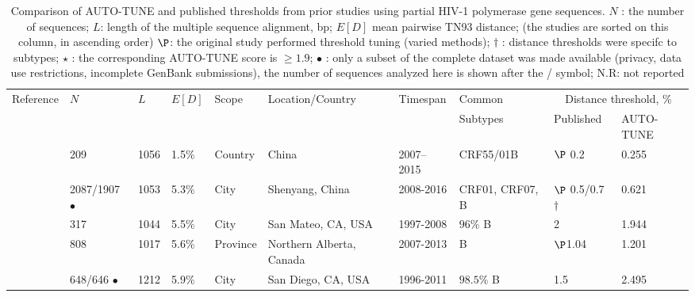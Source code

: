 \documentclass[utf8]{FrontiersinHarvard} %
\begin{document}
\begin{table}[h]
	\caption{Comparison of AUTO-TUNE and published thresholds from prior studies using partial HIV-1 polymerase gene sequences. $N$ : the number of sequences; $L$: length of the multiple sequence alignment, bp; $E[D]$ mean pairwise TN93 distance; (the studies are sorted on this column, in ascending order) $\P$: the original study performed threshold tuning (varied methods); $\dagger$ : distance thresholds were specifc to subtypes; $\star$ : the corresponding AUTO-TUNE score is $\geq 1.9$; $\bullet$ : only a subset of the complete dataset was made available (privacy, data use restrictions, incomplete GenBank submissions), the number of  sequences analyzed here is shown after the / symbol; N.R: not reported}

	\vspace{10pt}
	\centering
	\begin{ssmall}
		\label{tab:paperComparison}
		\begin{tabular}{llllllllll}
			\hline
			Reference                   & $N$                 & $L$  & $E[D]$ & Scope      & Location/Country         & Timespan  & Common                & \multicolumn{2}{c}{Distance threshold, \%}                  \\
			                            &                     &      &        &            &                          &           & Subtypes              & Published                                  & AUTO-TUNE      \\
			\hline
			\cite{Zai:2020aa}           & 209                 & 1056 & 1.5\%  & Country    & China                    & 2007–2015 & CRF55/01B             & $\P$ 0.2                                   & 0.255          \\
			\cite{liu_dynamics_2020}    & 2087/1907 $\bullet$ & 1053 & 5.3\%  & City       & Shenyang, China          & 2008-2016 & CRF01, CRF07, B       & $\P$ 0.5/0.7 $\dagger$                     & 0.621          \\
			\cite{dalai_combining_2018} & 317                 & 1044 & 5.5\%  & City       & San Mateo, CA, USA       & 1997-2008 & $96\%$ B              & 2                                          & 1.944          \\
			\cite{chato_public_2020}    & 808                 & 1017 & 5.6\%  & Province   & Northern Alberta, Canada & 2007-2013 & B                     & $\P$1.04                                   & 1.201          \\
			\cite{Little:2014aa}        & 648/646 $\bullet$   & 1212 & 5.9\%  & City       & San Diego, CA, USA       & 1996-2011 & $98.5\%$ B            & 1.5                                        & 2.495          \\

\end{tabular}
\end{ssmall}
\end{table}
\end{document}
